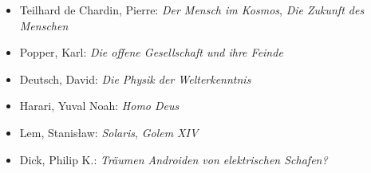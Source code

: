 \documentclass[
]{article}
\begin{document}
\begin{itemize}
\item Teilhard de Chardin, Pierre: \emph{Der Mensch im Kosmos}, \emph{Die Zukunft des Menschen}
\item Popper, Karl: \emph{Die offene Gesellschaft und ihre Feinde}
\item Deutsch, David: \emph{Die Physik der Welterkenntnis}
\item Harari, Yuval Noah: \emph{Homo Deus}
\item Lem, Stanisław: \emph{Solaris}, \emph{Golem XIV}
\item Dick, Philip K.: \emph{Träumen Androiden von elektrischen Schafen?}
\end{itemize}
\end{document}
